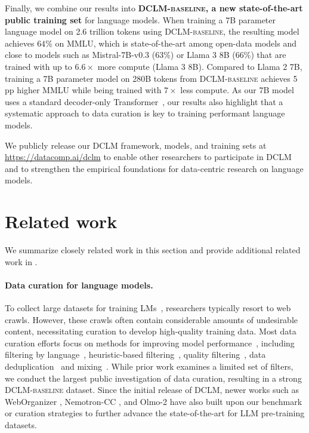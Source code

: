\documentclass{article}
\newcommand{\smallsec}[1]{\paragraph{#1}}
\newcommand{\dclm}{\textsc{DCLM}\xspace}
\newcommand{\bestmmlu}{$64$\xspace}
\newcommand{\hqpool}{\textsc{DCLM-baseline}\xspace}
\newcommand{\ourcode}{\url{https://datacomp.ai/dclm}\xspace}
\newcommand{\llama}{Llama\xspace}
\begin{document}
Finally, we combine our results into \textbf{\hqpool, a new state-of-the-art public training set} for language models.
When training a 7B parameter language model on 2.6 trillion tokens using \hqpool, the resulting model achieves \bestmmlu{}\% on MMLU, which is state-of-the-art among open-data models and close to models such as Mistral-7B-v0.3 (63\%) or \llama 3 8B (66\%) that are trained with up to $6.6\times$ more compute (\llama 3 8B).
Compared to \llama 2 7B, training a 7B parameter model on 280B tokens from \hqpool achieves 5 pp higher MMLU while being trained with $7 \times$ less compute.
As our 7B model uses a standard decoder-only Transformer~\citep{transformer,Radford2019LanguageMA,llama}, our results also highlight that a systematic approach to data curation is key to training performant language models.

We publicly release our \dclm framework, models, and training sets at \ourcode to enable other researchers to participate in \dclm and to strengthen the empirical foundations for data-centric research on language models.

\section{Related work}
\label{sec:related}

We summarize closely related work in this section and provide additional related work in .

\smallsec{Data curation for language models.}
To collect large datasets for training LMs~\citep{gpt3}, researchers typically resort to web crawls. However, these crawls often contain considerable amounts of undesirable content, necessitating curation to develop high-quality training data.
Most data curation efforts focus on methods for improving model performance~\citep{raffel2020exploring, gpt3, wenzek-etal-2020-ccnet, gopher, refinedweb, soldaini2024dolma}, including
filtering by language~\citep{NEURIPS2019_c04c19c2, raffel2020exploring, xue-etal-2021-mt5, NEURIPS2022_ce9e92e3}, heuristic-based filtering~\citep{pile, gopher, refinedweb, Chen2021EvaluatingLL, soldaini2024dolma}, quality filtering~\citep{wenzek-etal-2020-ccnet,du2022glam, longpre2023pretrainers, xie2023data,sachdeva2024train},
data deduplication~\citep{10.1145/1645953.1646283,Lee2021DeduplicatingTD} and mixing~\citep{xie2023doremi, cerebras2023slimpajama, albalak2023efficient}.
While prior work examines a limited set of filters, we conduct the largest public investigation of data curation, resulting in a strong \hqpool{} dataset. Since the initial release of DCLM, newer works such as WebOrganizer \citep{wettig2025organize}, Nemotron-CC \citep{su2024nemotroncc}, and Olmo-2 \citep{olmo20252olmo2furious} have also built upon our benchmark or curation strategies to further advance the state-of-the-art for LLM pre-training datasets.
\end{document}
